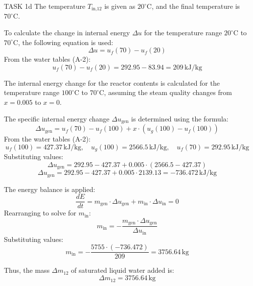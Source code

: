TASK 1d  
The temperature \( T_{\text{in,12}} \) is given as \( 20^\circ\text{C} \), and the final temperature is \( 70^\circ\text{C} \).  

To calculate the change in internal energy \( \Delta u \) for the temperature range \( 20^\circ\text{C} \) to \( 70^\circ\text{C} \), the following equation is used:  
\[
\Delta u = u_f(70) - u_f(20)
\]  
From the water tables (A-2):  
\[
u_f(70) - u_f(20) = 292.95 - 83.94 = 209 \, \text{kJ/kg}
\]  

The internal energy change for the reactor contents is calculated for the temperature range \( 100^\circ\text{C} \) to \( 70^\circ\text{C} \), assuming the steam quality changes from \( x = 0.005 \) to \( x = 0 \).  

The specific internal energy change \( \Delta u_{\text{gen}} \) is determined using the formula:  
\[
\Delta u_{\text{gen}} = u_f(70) - u_f(100) + x \cdot (u_g(100) - u_f(100))
\]  
From the water tables (A-2):  
\[
u_f(100) = 427.37 \, \text{kJ/kg}, \quad u_g(100) = 2566.5 \, \text{kJ/kg}, \quad u_f(70) = 292.95 \, \text{kJ/kg}
\]  
Substituting values:  
\[
\Delta u_{\text{gen}} = 292.95 - 427.37 + 0.005 \cdot (2566.5 - 427.37)
\]  
\[
\Delta u_{\text{gen}} = 292.95 - 427.37 + 0.005 \cdot 2139.13 = -736.472 \, \text{kJ/kg}
\]  

The energy balance is applied:  
\[
\frac{dE}{dt} = m_{\text{gen}} \cdot \Delta u_{\text{gen}} + m_{\text{in}} \cdot \Delta u_{\text{in}} = 0
\]  
Rearranging to solve for \( m_{\text{in}} \):  
\[
m_{\text{in}} = -\frac{m_{\text{gen}} \cdot \Delta u_{\text{gen}}}{\Delta u_{\text{in}}}
\]  
Substituting values:  
\[
m_{\text{in}} = -\frac{5755 \cdot (-736.472)}{209} = 3756.64 \, \text{kg}
\]  

Thus, the mass \( \Delta m_{12} \) of saturated liquid water added is:  
\[
\Delta m_{12} = 3756.64 \, \text{kg}
\]